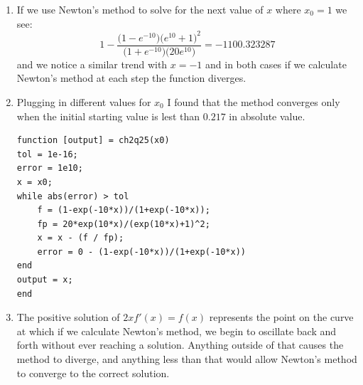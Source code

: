 \documentclass[11pt,a4paper]{article}
\begin{document}
\begin{itemize}
\begin{enumerate} [label={\alph*)}]
\begin{center}
					\end{center}
					
					\item If we use Newton's method to solve for the next value of $x$ where $x_0=1$ we see:
					$$1 - \frac{\big(1-e^{-10}\big)\big(e^{10}+1\big)^2}{\big(1+e^{-10}\big)\big(20e^{10}\big)} = -1100.323287$$
					and we notice a similar trend with $x=-1$ and in both cases if we calculate Newton's method at each step the function diverges.
					
					\item Plugging in different values for $x_0$ I found that the method converges only when the initial starting value is lest than $0.217$ in absolute value.
					\begin{lstlisting}
function [output] = ch2q25(x0)
tol = 1e-16;
error = 1e10;
x = x0;
while abs(error) > tol
    f = (1-exp(-10*x))/(1+exp(-10*x));
    fp = 20*exp(10*x)/(exp(10*x)+1)^2;
    x = x - (f / fp);
    error = 0 - (1-exp(-10*x))/(1+exp(-10*x))
end
output = x;
end
					\end{lstlisting}
					
					\item The positive solution of $2xf'(x) = f(x)$ represents the point on the curve at which if we calculate Newton's method, we begin to oscillate back and forth without ever reaching a solution. Anything outside of that causes the method to diverge, and anything less than that would allow Newton's method to converge to the correct solution.
					

\end{enumerate}
\end{itemize}
\end{document}
